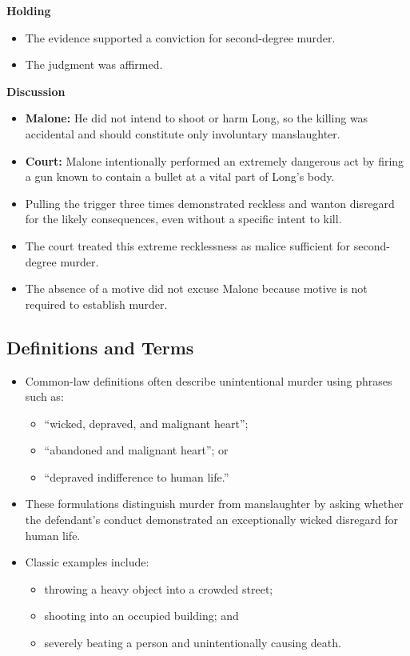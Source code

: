 \documentclass[11pt]{tex/lawoutline}
\begin{document}
{        \textbf{Holding}
        \begin{itemize}
            \item The evidence supported a conviction for second-degree murder.
            \item The judgment was affirmed.
        \end{itemize}

        \textbf{Discussion}
        \begin{itemize}
            \item \textbf{Malone:} He did not intend to shoot or harm Long, so the killing was accidental and should constitute only involuntary manslaughter.
            \item \textbf{Court:} Malone intentionally performed an extremely dangerous act by firing a gun known to contain a bullet at a vital part of Long's body.
            \item Pulling the trigger three times demonstrated reckless and wanton disregard for the likely consequences, even without a specific intent to kill.
            \item The court treated this extreme recklessness as malice sufficient for second-degree murder.
            \item The absence of a motive did not excuse Malone because motive is not required to establish murder.
        \end{itemize}
    }

\subsection{Definitions and Terms}
{
\begin{itemize}
    \item Common-law definitions often describe unintentional murder using phrases such as:
    \begin{itemize}
        \item ``wicked, depraved, and malignant heart'';
        \item ``abandoned and malignant heart''; or
        \item ``depraved indifference to human life.''
    \end{itemize}
    \item These formulations distinguish murder from manslaughter by asking whether the defendant's conduct demonstrated an exceptionally wicked disregard for human life.
    \item Classic examples include:
    \begin{itemize}
        \item throwing a heavy object into a crowded street;
        \item shooting into an occupied building; and
        \item severely beating a person and unintentionally causing death.
    \end{itemize}
\end{itemize}
}
\end{document}
